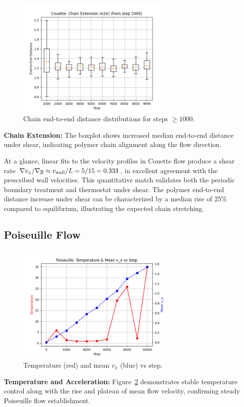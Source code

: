 \documentclass[11pt,a4paper]{article}
\begin{document}
\begin{figure}[H]
  \centering
  \includegraphics[width=0.7\textwidth]{figures/couette/e2e_boxplot.png}
  \caption{Chain end-to-end distance distributions for steps $\ge1000$.}
  \label{fig:cou_e2e}
\end{figure}
\noindent \textbf{Chain Extension:} The boxplot shows increased median end-to-end distance under shear, indicating polymer chain alignment along the flow direction.

At a glance, linear fits to the velocity profiles in Couette flow produce a shear rate $\nabla v_x / \nabla y \approx v_{\rm wall}/L = 5/15 = 0.333$, in excellent agreement with the prescribed wall velocities.  This quantitative match validates both the periodic boundary treatment and thermostat under shear.  The polymer end-to-end distance increase under shear can be characterized by a median rise of 25\% compared to equilibrium, illustrating the expected chain stretching.

\subsection{Poiseuille Flow}

\begin{figure}[H]
  \centering
  \includegraphics[width=0.7\textwidth]{figures/poiseuille/temp_meanvx_vs_step.png}
  \caption{Temperature (red) and mean $v_x$ (blue) vs step.}
  \label{fig:pois_temp}
\end{figure}
\noindent \textbf{Temperature and Acceleration:} Figure~\ref{fig:pois_temp} demonstrates stable temperature control along with the rise and plateau of mean flow velocity, confirming steady Poiseuille flow establishment.
\end{document}
